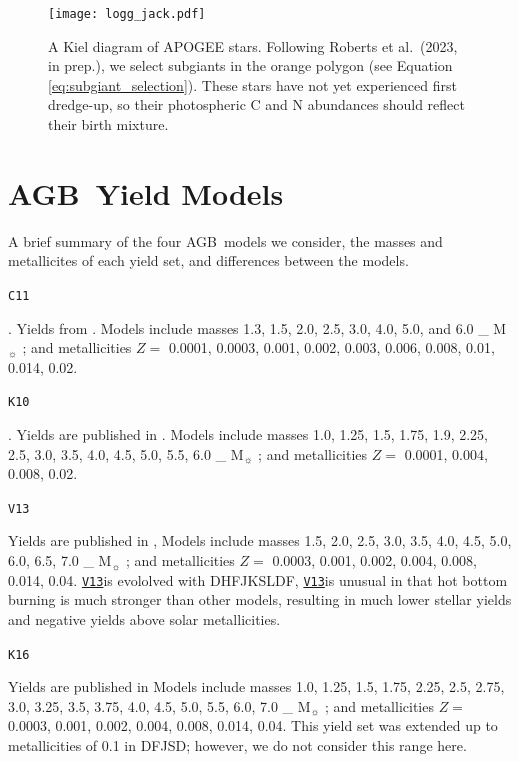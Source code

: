 \documentclass[fleqn,usenatbib]{mnras}
\newcommand{\citetjack}{Roberts et al.~(2023, in prep.)}
\newcommand{\vxiii}{\texttt{\hyperlink{V13}{V13}}}
\newcommand{\agb}{AGB}
\newcommand{\apogee}{APOGEE}
\newcommand{\Mo}{%
    \ifmmode {\rm M}_{\sun}%
    \else M$_{\sun}$
    \fi}
\begin{document}
\begin{figure}
    \centering
    \texttt{[image: logg\_jack.pdf]}
    \caption[Subgiant Selection]{
        A Kiel diagram of \apogee{} stars. Following \citetjack, we select subgiants in the orange polygon (see Equation \ref{eq:subgiant_selection}). These stars have not yet experienced first dredge-up, so their photospheric C and N abundances should reflect their birth mixture.
    }
    \label{fig:subgiant_selection}
\end{figure}



\section{\agb\ Yield Models} \label{sec:oob_models}
A brief summary of the four \agb\ models we consider, the masses and metallicites of each yield set, and differences between the models.

\hypertarget{C11}{\texttt{C11}}. 
Yields from \citet{cristallo+11,cristallo+15}. 
Models include masses 1.3, 1.5, 2.0, 2.5, 3.0, 4.0, 5.0, and 6.0 \Mo; and 
metallicities $Z = $ 0.0001, 0.0003, 0.001, 0.002, 0.003, 0.006, 0.008, 0.01, 0.014, 0.02. 

\hypertarget{K10}{\texttt{K10}}.
Yields are published in \citet{karakas10}. 
Models include masses  1.0, 1.25, 1.5, 1.75, 1.9, 2.25, 2.5, 3.0, 3.5, 4.0, 4.5, 5.0, 5.5, 6.0 \Mo;
and metallicities $Z=$ 0.0001, 0.004, 0.008, 0.02. 

\hypertarget{V13}{\texttt{V13}} 
Yields are published in \citet{ventura+13,ventura+14,ventura+18,vincenzo+21}, 
Models include masses 1.5, 2.0, 2.5, 3.0, 3.5, 4.0, 4.5, 5.0, 6.0, 6.5, 7.0 \Mo; 
and metallicities $Z=$ 0.0003, 0.001, 0.002, 0.004, 0.008, 0.014, 0.04.
\vxiii is evololved with DHFJKSLDF,
\vxiii is unusual in that hot bottom burning is much stronger than other models, resulting in much lower stellar yields and negative yields above solar metallicities.


\hypertarget{K16}{\texttt{K16}} 
Yields are published in \citet{KL16,karakas+18}
Models include masses 1.0, 1.25, 1.5, 1.75, 2.25, 2.5, 2.75, 3.0, 3.25, 3.5, 3.75, 4.0, 4.5, 5.0, 5.5, 6.0, 7.0 \Mo; 
and metallicities $Z=$ 0.0003, 0.001, 0.002, 0.004, 0.008, 0.014, 0.04.
This yield set was extended up to metallicities of 0.1 in DFJSD; however, we do not consider this range here.


\bsp	%
\label{lastpage}
\end{document}
